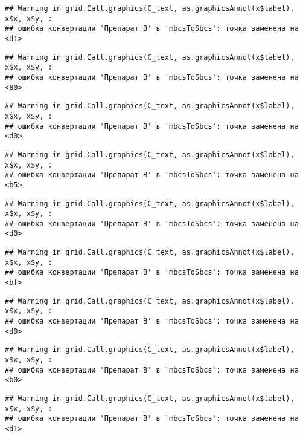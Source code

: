 \documentclass[
]{article}
\begin{document}
\begin{verbatim}
## Warning in grid.Call.graphics(C_text, as.graphicsAnnot(x$label), x$x, x$y, :
## ошибка конвертации 'Препарат B' в 'mbcsToSbcs': точка заменена на <d1>
\end{verbatim}

\begin{verbatim}
## Warning in grid.Call.graphics(C_text, as.graphicsAnnot(x$label), x$x, x$y, :
## ошибка конвертации 'Препарат B' в 'mbcsToSbcs': точка заменена на <80>
\end{verbatim}

\begin{verbatim}
## Warning in grid.Call.graphics(C_text, as.graphicsAnnot(x$label), x$x, x$y, :
## ошибка конвертации 'Препарат B' в 'mbcsToSbcs': точка заменена на <d0>
\end{verbatim}

\begin{verbatim}
## Warning in grid.Call.graphics(C_text, as.graphicsAnnot(x$label), x$x, x$y, :
## ошибка конвертации 'Препарат B' в 'mbcsToSbcs': точка заменена на <b5>
\end{verbatim}

\begin{verbatim}
## Warning in grid.Call.graphics(C_text, as.graphicsAnnot(x$label), x$x, x$y, :
## ошибка конвертации 'Препарат B' в 'mbcsToSbcs': точка заменена на <d0>
\end{verbatim}

\begin{verbatim}
## Warning in grid.Call.graphics(C_text, as.graphicsAnnot(x$label), x$x, x$y, :
## ошибка конвертации 'Препарат B' в 'mbcsToSbcs': точка заменена на <bf>
\end{verbatim}

\begin{verbatim}
## Warning in grid.Call.graphics(C_text, as.graphicsAnnot(x$label), x$x, x$y, :
## ошибка конвертации 'Препарат B' в 'mbcsToSbcs': точка заменена на <d0>
\end{verbatim}

\begin{verbatim}
## Warning in grid.Call.graphics(C_text, as.graphicsAnnot(x$label), x$x, x$y, :
## ошибка конвертации 'Препарат B' в 'mbcsToSbcs': точка заменена на <b0>
\end{verbatim}

\begin{verbatim}
## Warning in grid.Call.graphics(C_text, as.graphicsAnnot(x$label), x$x, x$y, :
## ошибка конвертации 'Препарат B' в 'mbcsToSbcs': точка заменена на <d1>
\end{verbatim}
\end{document}
